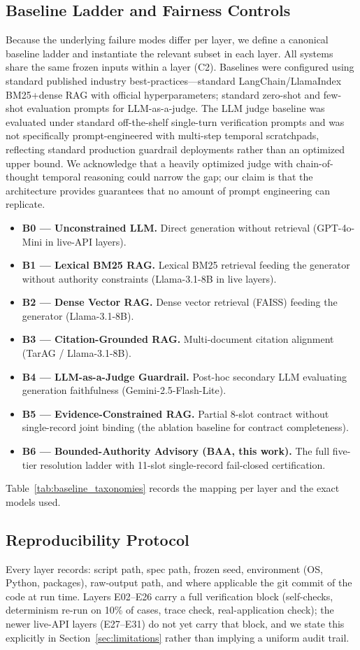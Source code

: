 \subsection{Baseline Ladder and Fairness Controls}
Because the underlying failure modes differ per layer, we define a canonical baseline ladder and instantiate the relevant subset in each layer. All systems share the same frozen inputs within a layer (C2). Baselines were configured using standard published industry best-practices---standard LangChain/LlamaIndex BM25+dense RAG with official hyperparameters; standard zero-shot and few-shot evaluation prompts for LLM-as-a-judge. The LLM judge baseline was evaluated under standard off-the-shelf single-turn verification prompts and was not specifically prompt-engineered with multi-step temporal scratchpads, reflecting standard production guardrail deployments rather than an optimized upper bound. We acknowledge that a heavily optimized judge with chain-of-thought temporal reasoning could narrow the gap; our claim is that the architecture provides guarantees that no amount of prompt engineering can replicate.
\begin{itemize}
    \item \textbf{B0 --- Unconstrained LLM.} Direct generation without retrieval (GPT-4o-Mini in live-API layers).
    \item \textbf{B1 --- Lexical BM25 RAG.} Lexical BM25 retrieval feeding the generator without authority constraints (Llama-3.1-8B in live layers).
    \item \textbf{B2 --- Dense Vector RAG.} Dense vector retrieval (FAISS) feeding the generator (Llama-3.1-8B).
    \item \textbf{B3 --- Citation-Grounded RAG.} Multi-document citation alignment (TarAG / Llama-3.1-8B).
    \item \textbf{B4 --- LLM-as-a-Judge Guardrail.} Post-hoc secondary LLM evaluating generation faithfulness (Gemini-2.5-Flash-Lite).
    \item \textbf{B5 --- Evidence-Constrained RAG.} Partial 8-slot contract without single-record joint binding (the ablation baseline for contract completeness).
    \item \textbf{B6 --- Bounded-Authority Advisory (BAA, this work).} The full five-tier resolution ladder with 11-slot single-record fail-closed certification.
\end{itemize}
Table~\ref{tab:baseline_taxonomies} records the mapping per layer and the exact models used.

\subsection{Reproducibility Protocol}
Every layer records: script path, spec path, frozen seed, environment (OS, Python, packages), raw-output path, and where applicable the git commit of the code at run time. Layers E02--E26 carry a full verification block (self-checks, determinism re-run on 10\% of cases, trace check, real-application check); the newer live-API layers (E27--E31) do not yet carry that block, and we state this explicitly in Section~\ref{sec:limitations} rather than implying a uniform audit trail.


